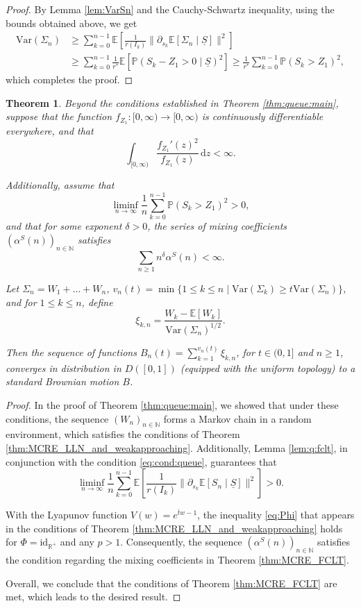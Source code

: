 \documentclass[a4paper,10pt]{article}
\newtheorem{theorem}{Theorem}[section]
\newcommand{\N}{\mathbb{N}}
\renewcommand{\P}{\mathbb{P}}
\newcommand{\E}{\mathbb{E}}
\newcommand{\var}{\mathrm{Var}}
\newcommand{\ul}[1]{\underline{#1}}
\begin{document}
\begin{proof}
	By Lemma \ref{lem:VarSn} and the Cauchy-Schwartz inequality, using the bounds obtained above, we get
	\begin{align*}
		\var(\Sigma_n) &\geq \sum_{k=0}^{n-1} \mathbb{E} \left[ \frac{1}{r(I_k)} \lVert \partial_{s_k} \mathbb{E} \left[ \Sigma_n \mid \ul{S} \right] \rVert^2 \right]
		\\
		&\geq \sum_{k=0}^{n-1} \frac{1}{r^*} \mathbb{E} \left[ \mathbb{P}(S_k - Z_1 > 0 \mid \ul{S})^2 \right]
		\geq \frac{1}{r^*}\sum_{k=0}^{n-1}\P (S_k>Z_1)^2,
	\end{align*}
	which completes the proof.
\end{proof}

\begin{theorem}\label{thm:queue:FCLT}
	Beyond the conditions established in Theorem \ref{thm:queue:main}, suppose that the function $f_{Z_1}: [0, \infty) \to [0, \infty)$ is continuously differentiable everywhere, and that
	\[
	\int_{[0, \infty)} \frac{f_{Z_1}'(z)^2}{f_{Z_1}(z)} \,\mathrm{d}z < \infty.
	\]
	
	Additionally, assume that 
	\begin{equation}\label{eq:cond:queue}
	\liminf_{n\to\infty}\frac{1}{n}\sum_{k=0}^{n-1}\P (S_k > Z_1)^2 > 0,
	\end{equation}
	and that for some exponent $\delta > 0$, the series of mixing coefficients $(\alpha^S(n))_{n \in \N}$ satisfies
	\[
	\sum_{n \geq 1} n^{\delta} \alpha^S(n) < \infty.
	\]
	
	Let $\Sigma_n = W_1 + \ldots + W_n$, $v_n(t) = \min \{ 1 \leq k \leq n \mid \var(\Sigma_k) \geq t \var(\Sigma_n) \}$, and for $1 \leq k \leq n$, define
	\[
	\xi_{k,n} = \frac{W_k - \E [W_k]}{\var(\Sigma_n)^{1/2}}.
	\]
	
	Then the sequence of functions $B_n(t) = \sum_{k=1}^{v_n(t)} \xi_{k,n}$, for $t \in (0, 1]$ and $n \geq 1$, converges in distribution in $D([0, 1])$ (equipped with the uniform topology) to a standard Brownian motion $B$.
\end{theorem}
\begin{proof}
	In the proof of Theorem \ref{thm:queue:main}, we showed that under these conditions, the sequence $(W_n)_{n \in \N}$ forms a Markov chain in a random environment, which satisfies the conditions of Theorem \ref{thm:MCRE_LLN_and_weakapproaching}. Additionally, Lemma \ref{lem:q:fclt}, in conjunction with the condition \eqref{eq:cond:queue}, guarantees that 
	\[
	\liminf_{n\to\infty}\frac{1}{n}\sum_{k=0}^{n-1}\E \left[ \frac{1}{r(I_k)} \lVert \partial_{s_k} \E \left[ S_n \mid \ul{S} \right] \rVert^2 \right]>0.
	\] 
	
	With the Lyapunov function $V(w) = e^{\bar{t}w - 1}$, the inequality \eqref{eq:Phi} that appears in the conditions of Theorem \ref{thm:MCRE_LLN_and_weakapproaching} holds for  $\Phi = \mathrm{id}_{\mathbb{R}^+}$ and any $p > 1$. Consequently, the sequence $(\alpha^S(n))_{n \in \mathbb{N}}$ satisfies the condition regarding the mixing coefficients in Theorem \ref{thm:MCRE_FCLT}. 
	
	Overall, we conclude that the conditions of Theorem \ref{thm:MCRE_FCLT} are met, which leads to the desired result.
\end{proof}
\end{document}
